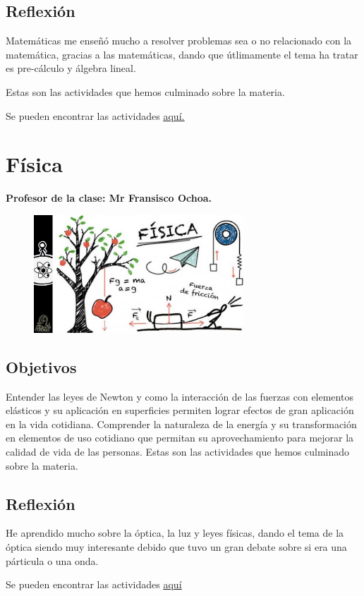 \documentclass[a4paper, 12pt]{article}
\begin{document}
\subsection{Reflexión}

Matemáticas me enseñó mucho a resolver problemas sea o no relacionado con la matemática, gracias a las matemáticas, dando que útlimamente el tema ha tratar es pre-cálculo y álgebra lineal.

Estas son las actividades que hemos culminado sobre la materia.

Se pueden encontrar las actividades \href{https://drive.google.com/drive/folders/1PRIU_AXDg9u1KO9Lou-fAq308nmebbqo?usp=sharing}{\underline{aquí.}}

\section{Física}
\textbf{Profesor de la clase: Mr Fransisco Ochoa.}

\begin{figure}[h]
  \includegraphics[width=0.7\textwidth, center]{fisi.jpeg}
\end{figure}

\subsection{Objetivos}
Entender las leyes de Newton y como la interacción de las fuerzas con elementos elásticos y su aplicación en superficies permiten lograr efectos de gran aplicación en la vida cotidiana. Comprender la naturaleza de la energía y su transformación en elementos de uso cotidiano que permitan su aprovechamiento para mejorar la calidad de vida de las personas.
Estas son las actividades que hemos culminado sobre la materia.

\subsection{Reflexión}
He aprendido mucho sobre la óptica, la luz y leyes físicas, dando el tema de la óptica siendo muy interesante debido que tuvo un gran debate sobre si era una párticula o una onda.

Se pueden encontrar las actividades \href{https://drive.google.com/drive/folders/1TrRKvzmpVNuXv89DHbMKKkIT746Uk8yG?usp=sharing}{\underline{aquí}}
\end{document}
